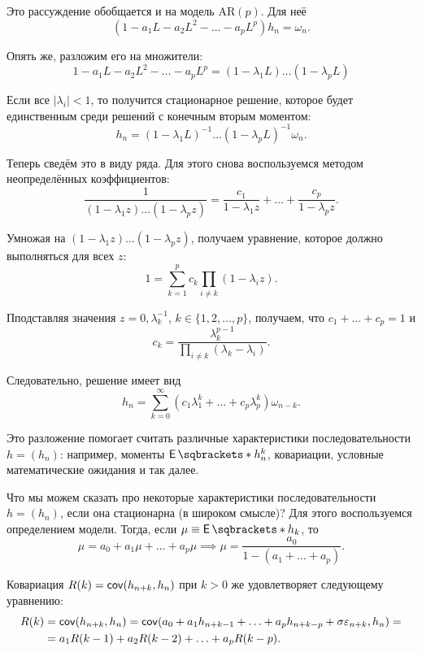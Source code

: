 Это рассуждение обобщается и на модель \(\mathrm{AR}(p)\). Для неё
\[
	(1 - a_{1}L - a_{2}L^{2} - \ldots - a_{p}L^{p})h_{n} = \omega_{n}.
\]

Опять же, разложим его на множители:
\[
	1 - a_{1}L - a_{2}L^{2} - \ldots - a_{p}L^{p} = (1 - \lambda_{1}L)\ldots(1 
	- \lambda_{p}L)
\]

Если все \(|\lambda_{i}| < 1\), то получится стационарное решение, которое 
будет единственным среди решений с конечным вторым моментом:
\[
	h_{n} = (1 - \lambda_{1}L)^{-1}\ldots(1 - \lambda_{p}L)^{-1}\omega_{n}.
\]

Теперь сведём это в виду ряда. Для этого снова воспользуемся методом 
неопределённых коэффициентов:
\[
	\frac{1}{(1 - \lambda_{1}z)\ldots(1 - \lambda_{p}z)} = \frac{c_{1}}{1 - 
	\lambda_{1}z} + \ldots + \frac{c_{p}}{1 - \lambda_{p}z}.
\]

Умножая на \((1 - \lambda_{1}z)\ldots(1 - \lambda_{p}z)\), получаем уравнение, 
которое должно выполняться для всех \(z\):
\[
	1 = \sum_{k = 1}^{p}c_{k}\prod_{i \neq k}(1 - \lambda_{i}z).
\]

Пподставляя значения \(z = 0, \lambda_{k}^{-1}\), \(k \in \{1, 2, \ldots, 
p\}\), получаем, что \(c_{1} + \ldots + c_{p} = 1\) и
\[
	c_{k} = \frac{\lambda_{k}^{p - 1}}{\prod_{i \neq k}(\lambda_{k} - 
	\lambda_{i})}.
\]

Следовательно, решение имеет вид
\[
	h_{n} = \sum_{k = 0}^{\infty}(c_{1}\lambda_{1}^{k} + \ldots + 
	c_{p}\lambda_{p}^{k})\omega_{n - k}.
\]

Это разложение помогает считать различные характеристики последовательности \(h 
= (h_{n})\): например, моменты \(\E{h_{n}^{k}}\), ковариации, условные 
математические ожидания и так далее.

Что мы можем сказать про некоторые характеристики последовательности \(h = 
(h_{n})\), если она стационарна (в широком смысле)? Для этого воспользуемся 
определением модели. Тогда, если \(\mu \equiv \E{h_{k}}\), то
\[
	\mu = a_{0} + a_{1}\mu + \ldots + a_{p}\mu \implies \mu = \frac{a_{0}}{1 - 
	(a_{1} + \ldots + a_{p})}.
\]

Ковариация \(R(k) = \operatorname{\mathsf{cov}}(h_{n + k}, h_{n})\)  при \(k > 0\) же удовлетворяет 
следующему уравнению:
\begin{align*}
	R(k) &= \operatorname{\mathsf{cov}}(h_{n + k}, h_{n}) = \operatorname{\mathsf{cov}}(a_{0} + a_{1}h_{n + k - 1} + \ldots + 
	a_{p}h_{n + k - p} + \sigma\varepsilon_{n + k}, h_{n}) = \\
	&= a_{1}R(k - 1) + a_{2}R(k - 2) + \ldots + a_{p}R(k - p).
\end{align*}

